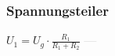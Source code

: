 \subsubsection{Spannungsteiler} 
\begin{minipage}{0.45\textwidth} 
\end{minipage} 
\begin{minipage}{0.45\textwidth} 
 
\end{minipage} 
$ U_{1}  = U_{g} \cdot \frac{ R_{1} }{R_{1} +R_{2} } $ \textcolor{lightgray}{\textbf{---}} 


